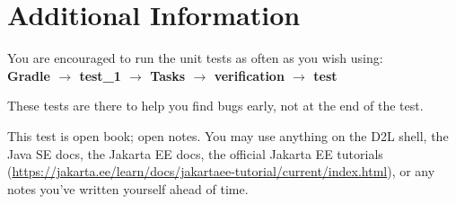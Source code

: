 \documentclass{article}
\begin{document}
\section{Additional Information}

You are encouraged to run the unit tests as often as you wish using:\\\textbf{Gradle $\rightarrow$ test\_1 $\rightarrow$ Tasks $\rightarrow$ verification $\rightarrow$ test}

These tests are there to help you find bugs early, not at the end of the test.

This test is open book; open notes. You may use anything on the D2L shell, the Java SE docs,
the Jakarta EE docs, the official Jakarta EE tutorials (\url{https://jakarta.ee/learn/docs/jakartaee-tutorial/current/index.html}),
or any notes you've written yourself ahead of time.
\end{document}
